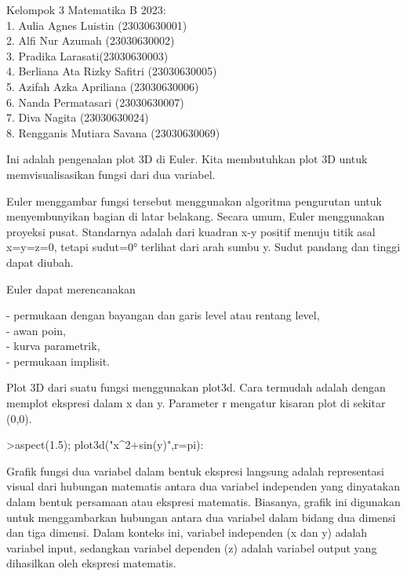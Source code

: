 \documentclass[a4paper,10pt]{article}
\begin{document}
\begin{eulernotebook}
\begin{eulercomment}
Kelompok 3 Matematika B 2023:\\
1. Aulia Agnes Luistin (23030630001)\\
2. Alfi Nur Azumah (23030630002)\\
3. Pradika Larasati(23030630003)\\
4. Berliana Ata Rizky Safitri (23030630005)\\
5. Azifah Azka Apriliana (23030630006)\\
6. Nanda Permatasari (23030630007)\\
7. Diva Nagita (23030630024)\\
8. Rengganis Mutiara Savana (23030630069)

\begin{eulercomment}
\begin{eulercomment}
Ini adalah pengenalan plot 3D di Euler. Kita membutuhkan plot 3D untuk
memvisualisasikan fungsi dari dua variabel.

Euler menggambar fungsi tersebut menggunakan algoritma pengurutan
untuk menyembunyikan bagian di latar belakang. Secara umum, Euler
menggunakan proyeksi pusat. Standarnya adalah dari kuadran x-y positif
menuju titik asal x=y=z=0, tetapi sudut=0° terlihat dari arah sumbu y.
Sudut pandang dan tinggi dapat diubah.

Euler dapat merencanakan

- permukaan dengan bayangan dan garis level atau rentang level,\\
- awan poin,\\
- kurva parametrik,\\
- permukaan implisit.

Plot 3D dari suatu fungsi menggunakan plot3d. Cara termudah adalah
dengan memplot ekspresi dalam x dan y. Parameter r mengatur kisaran
plot di sekitar (0,0).
\end{eulercomment}
\begin{eulerprompt}
>aspect(1.5); plot3d("x^2+sin(y)",r=pi): 
\end{eulerprompt}
\begin{eulercomment}
Grafik fungsi dua variabel dalam bentuk ekspresi langsung adalah
representasi visual dari hubungan matematis antara dua variabel
independen yang dinyatakan dalam bentuk persamaan atau ekspresi
matematis. Biasanya, grafik ini digunakan untuk menggambarkan hubungan
antara dua variabel dalam bidang dua dimensi dan tiga dimensi. Dalam
konteks ini, variabel independen (x dan y) adalah variabel input,
sedangkan variabel dependen (z) adalah variabel output yang dihasilkan
oleh ekspresi matematis.


\end{eulercomment}
\end{eulercomment}
\end{eulercomment}
\end{eulernotebook}
\end{document}
